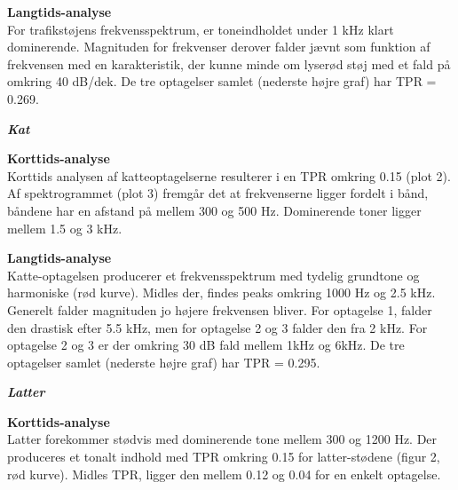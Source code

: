 
\newpage
\textbf{Langtids-analyse} \\
For trafikstøjens frekvensspektrum, er toneindholdet under 1 kHz klart dominerende. Magnituden for frekvenser derover falder jævnt som funktion af frekvensen med en karakteristik, der kunne minde om lyserød støj med et fald på omkring 40 dB/dek. De tre optagelser samlet (nederste højre graf) har TPR = 0.269.


\newpage
\begin{center}\textit{\textbf{Kat}}\end{center}
\textbf{Korttids-analyse} \\
Korttids analysen af katteoptagelserne resulterer i en TPR omkring 0.15 (plot 2). Af spektrogrammet (plot 3) fremgår det at frekvenserne ligger fordelt i bånd, båndene har en afstand på mellem 300 og 500 Hz. Dominerende toner ligger mellem 1.5 og 3 kHz.


\newpage
\textbf{Langtids-analyse} \\
Katte-optagelsen producerer et frekvensspektrum med tydelig grundtone og harmoniske (rød kurve). Midles der, findes peaks omkring 1000 Hz og 2.5 kHz. Generelt falder magnituden jo højere frekvensen bliver. For optagelse 1, falder den drastisk efter 5.5 kHz, men for optagelse 2 og 3 falder den fra 2 kHz. For optagelse 2 og 3 er der omkring 30 dB fald mellem 1kHz og 6kHz. De tre optagelser samlet (nederste højre graf) har TPR = 0.295.


\newpage
\begin{center}\textit{\textbf{Latter}}\end{center}
\textbf{Korttids-analyse} \\
Latter forekommer stødvis med dominerende tone mellem 300 og 1200 Hz. Der produceres et tonalt indhold med TPR omkring 0.15 for latter-stødene (figur 2, rød kurve). Midles TPR, ligger den mellem 0.12 og 0.04 for en enkelt optagelse.

